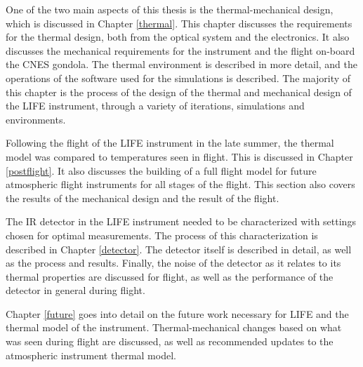 One of the two main aspects of this thesis is the thermal-mechanical design, which is discussed in Chapter \ref{thermal}. This chapter discusses the requirements for the thermal design, both from the optical system and the electronics. It also discusses the mechanical requirements for the instrument and the flight on-board the CNES gondola. The thermal environment is described in more detail, and the operations of the software used for the simulations is described. The majority of this chapter is the process of the design of the thermal and mechanical design of the LIFE instrument, through a variety of iterations, simulations and environments.

Following the flight of the LIFE instrument in the late summer, the thermal model was compared to temperatures seen in flight. This is discussed in Chapter \ref{postflight}. It also discusses the building of a full flight model for future atmospheric flight instruments for all stages of the flight. This section also covers the results of the mechanical design and the result of the flight.

The IR detector in the LIFE instrument needed to be characterized with settings chosen for optimal measurements. The process of this characterization is described in Chapter \ref{detector}. The detector itself is described in detail, as well as the process and results. Finally, the noise of the detector as it relates to its thermal properties are discussed for flight, as well as the performance of the detector in general during flight.

Chapter \ref{future} goes into detail on the future work necessary for LIFE and the thermal model of the instrument. Thermal-mechanical changes based on what was seen during flight are discussed, as well as recommended updates to the atmospheric instrument thermal model.
